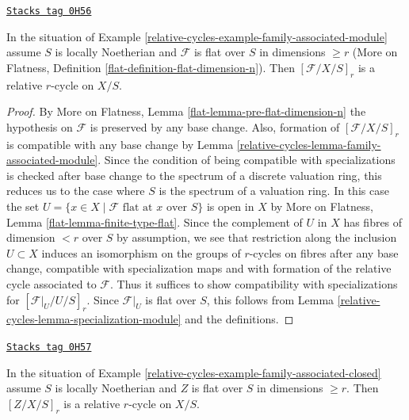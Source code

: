 \begin{lemma}
\label{relative-cycles-lemma-family-associated-module-specialization}
\href{https://stacks.math.columbia.edu/tag/0H56}{\texttt{Stacks tag 0H56}}

In the situation of Example \ref{relative-cycles-example-family-associated-module}
assume $S$ is locally Noetherian and
$\mathcal{F}$ is flat over $S$ in dimensions $\geq r$
(More on Flatness, Definition \ref{flat-definition-flat-dimension-n}).
Then $[\mathcal{F}/X/S]_r$ is a relative $r$-cycle on $X/S$.
\end{lemma}

\begin{proof}
By More on Flatness, Lemma \ref{flat-lemma-pre-flat-dimension-n}
the hypothesis on $\mathcal{F}$ is preserved by any base change.
Also, formation of $[\mathcal{F}/X/S]_r$ is compatible with any
base change by Lemma \ref{relative-cycles-lemma-family-associated-module}.
Since the condition of being compatible with specializations
is checked after base change to the spectrum of a discrete valuation ring,
this reduces us to the case where $S$ is the spectrum of a valuation ring.
In this case the set
$U = \{x \in X \mid \mathcal{F}\text{ flat at }x\text{ over }S\}$
is open in $X$ by
More on Flatness, Lemma \ref{flat-lemma-finite-type-flat}.
Since the complement of $U$ in $X$ has fibres of dimension $< r$ over
$S$ by assumption, we see that restriction along the inclusion
$U \subset X$ induces an isomorphism on the groups of $r$-cycles
on fibres after any base change, compatible with specialization maps
and with formation of the relative cycle associated to $\mathcal{F}$.
Thus it suffices to show compatibility with
specializations for $[\mathcal{F}|_U / U /S]_r$.
Since $\mathcal{F}|_U$ is flat over $S$, this follows from
Lemma \ref{relative-cycles-lemma-specialization-module} and the definitions.
\end{proof}

\begin{lemma}
\label{relative-cycles-lemma-family-associated-closed-specialization}
\href{https://stacks.math.columbia.edu/tag/0H57}{\texttt{Stacks tag 0H57}}

In the situation of Example \ref{relative-cycles-example-family-associated-closed}
assume $S$ is locally Noetherian and $Z$ is flat over $S$ in dimensions
$\geq r$. Then $[Z/X/S]_r$ is a relative $r$-cycle on $X/S$.
\end{lemma}

